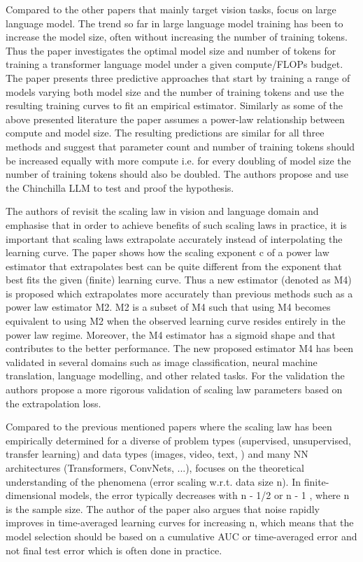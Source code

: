 \documentclass{article} %
\begin{document}
Compared to the other papers that mainly target vision tasks, \cite{hoffmann2022training} focus on large language model. The trend so far in large language model training has been to increase the model size, often without increasing the number of training tokens. Thus the paper investigates the optimal model size and number of tokens for training a transformer language model under a given compute/FLOPs budget. The paper presents three predictive approaches that start by training a range of models varying both model size and the number of training tokens and use the resulting training curves to fit an empirical estimator. Similarly as some of the above presented literature the paper assumes a power-law relationship between compute and model size. The resulting predictions are similar for all three methods and suggest that parameter count and number of training tokens should be increased equally with more compute i.e. for every doubling of model size the number of training tokens should also be doubled. The authors propose and use the Chinchilla LLM to test and proof the hypothesis.

The authors of \cite{alabdulmohsin2022revisiting} revisit the scaling law in vision and language domain and emphasise that in order to achieve benefits of such scaling laws in practice, it is important that scaling laws extrapolate accurately instead of interpolating the learning curve. The paper shows how the scaling exponent c of a power law estimator that extrapolates best can be quite different from the exponent that best fits the given (finite) learning curve. Thus a new estimator (denoted as M4) is proposed which extrapolates more accurately than previous methods such as a power law estimator M2. M2 is a subset of M4 such that using M4 becomes equivalent to using M2 when the observed learning curve resides entirely in the power law regime. Moreover, the M4 estimator has a sigmoid shape and that contributes to the better performance. The new proposed estimator M4 has been validated in several domains such as image classification, neural machine translation, language modelling, and other related tasks. For the validation the authors propose a more rigorous validation of scaling law parameters based on the extrapolation loss.

Compared to the previous mentioned papers where the scaling law has been empirically determined for a diverse of problem types (supervised, unsupervised, transfer learning) and data types (images, video, text, ) and many NN architectures (Transformers, ConvNets, ...), \cite{hutter2021learning} focuses on the theoretical understanding of the phenomena (error scaling w.r.t. data size n). In finite-dimensional models, the error typically decreases with n - 1/2 or n - 1 , where n is the sample size. The author of the paper also argues that noise rapidly improves in time-averaged learning curves for increasing n, which means that the model selection should be based on a cumulative AUC or time-averaged error and not final test error which is often done in practice.
\end{document}
